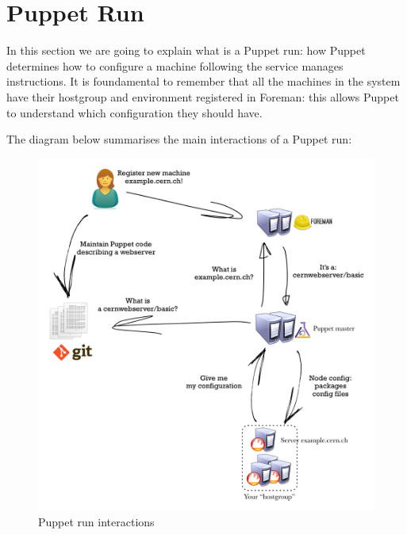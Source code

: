 \section{Puppet Run}

In this section we are going to explain what is a Puppet run: how Puppet
determines how to configure a machine following the service manages
instructions. It is foundamental to remember that all the machines in the
system have their hostgroup and environment registered in Foreman: this
allows Puppet to understand which configuration they should have.

The diagram below summarises the main interactions of a Puppet run:

\begin{figure}[H]
\includegraphics[width=\textwidth,height=\textheight,keepaspectratio]{ConfigurationManagement/PuppetRun/PuppetRun.png}
\caption{Puppet run interactions}
\end{figure}

